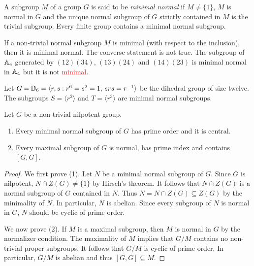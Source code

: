 A subgroup $M$ of a group $G$ is said to be {\em minimal normal} if $M\ne\{1\}$,
$M$ is normal in $G$ and the unique normal subgroup of $G$ strictly contained in $M$ is
the trivial subgroup. Every finite group contains a minimal normal subgroup.  

\begin{example}
	If a non-trivial normal subgroup $M$ is minimal (with respect to the inclusion), then it is
	minimal normal. The converse statement is not true. The subgroup of 
	$\mathbb{A}_4$ generated by $(12)(34)$, $(13)(24)$ and $(14)(23)$ is minimal normal in 
	$\mathbb{A}_4$ but it is not \textcolor{red}{minimal}. 
\end{example}

\begin{example}
	Let $G=\mathbb{D}_{6}=\langle r,s:r^6=s^2=1,\,srs=r^{-1}\rangle$ be the dihedral group
	of size twelve. The subgroups $S=\langle r^2\rangle$ 
	and $T=\langle r^3\rangle$ are minimal normal subgroups.
	\end{example}


\begin{theorem}\label{theorem:minmax_nilpotent}
	Let $G$ be a non-trivial nilpotent group. %
	\begin{enumerate}
		\item Every minimal normal subgroup of $G$ has prime order and it is central. 
		\item Every maximal subgroup of $G$ is normal, has prime index and contains $[G,G]$. 
	\end{enumerate}
\end{theorem}

\begin{proof}
	We first prove (1). Let $N$ be a minimal normal subgroup of $G$. Since $G$ is nilpotent, 
	$N\cap Z(G)\ne\{1\}$ by Hirsch's theorem. It follows that $N\cap Z(G)$ is a normal subgroup of $G$ contained in $N$. 
	Thus $N=N\cap Z(G)\subseteq
	Z(G)$ by the minimality of $N$. In particular, $N$ is abelian. Since 
	every subgroup of $N$ is normal in $G$, $N$ should be cyclic of prime order.

	We now prove (2). If $M$ is a maximal subgroup, then $M$
	is normal in $G$ by the normalizer condition. The maximality of $M$ implies that 
	$G/M$ contains no non-trivial proper subgroups. It follows that $G/M$ is cyclic of prime order. In particular, 
	$G/M$ is abelian and thus $[G,G]\subseteq M$. 
\end{proof}

